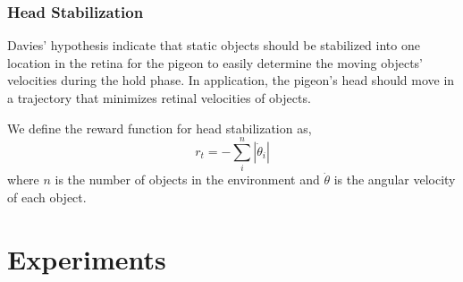   \subsection{Head Stabilization}
    Davies' hypothesis indicate that static objects should be stabilized into one location in the retina for the pigeon to easily determine the moving objects' velocities during the hold phase. In application, the pigeon's head should move in a trajectory that minimizes retinal velocities of objects.

    We define the reward function for head stabilization as,
    \begin{equation}
      r_t = - \sum_i^n |\dot \theta_i|
    \end{equation}
    where $n$ is the number of objects in the environment and $\dot \theta$ is the angular velocity of each object.





\chapter{Experiments}

